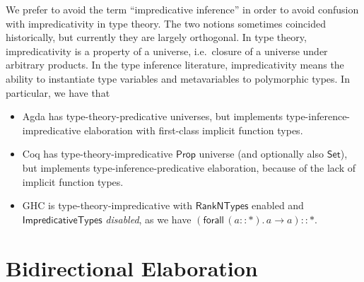 \documentclass[acmsmall,review,anonymous,prologue,dvipsnames]{acmart}\settopmatter{printfolios=true,printccs=false,printacmref=false}
\newcommand{\kw}[1]{{\mathsf{#1}}}
\theoremstyle{remark}
\begin{document}
We prefer to avoid the term ``impredicative inference'' in order to avoid
confusion with impredicativity in type theory. The two notions sometimes
coincided historically, but currently they are largely orthogonal. In type
theory, impredicativity is a property of a universe, i.e.\ closure of a universe
under arbitrary products. In the type inference literature, impredicativity
means the ability to instantiate type variables and metavariables to polymorphic
types. In particular, we have that
\begin{itemize}
  \item Agda has type-theory-predicative universes, but implements
    type-inference-impredicative elaboration with first-class implicit function
    types.
  \item Coq has type-theory-impredicative $\kw{Prop}$ universe (and optionally
    also $\kw{Set}$), but implements type-inference-predicative elaboration,
    because of the lack of implicit function types.
  \item GHC is type-theory-impredicative with $\kw{RankNTypes}$ enabled and
    $\kw{ImpredicativeTypes}$ \emph{disabled}, as we have $(\kw{forall}\,(a :: *).\, a
    \to a) :: *$.
\end{itemize}

\section{Bidirectional Elaboration}
\label{sec:bidirectional_elaboration}
\end{document}
